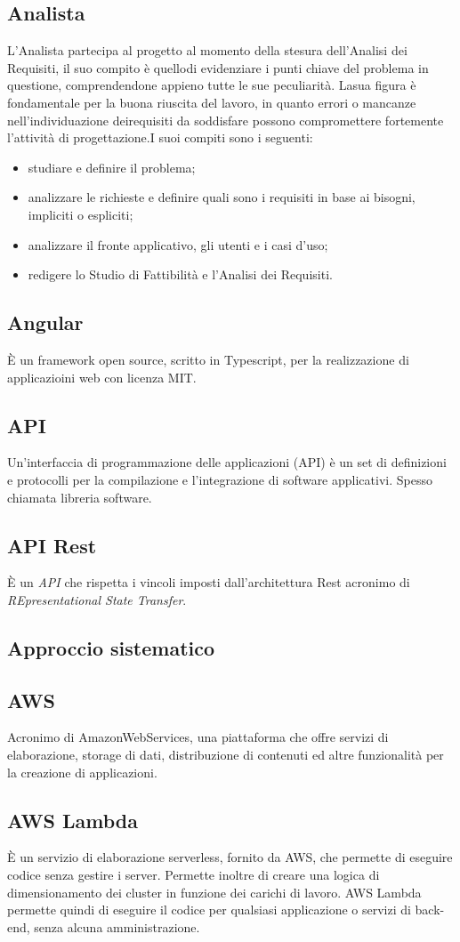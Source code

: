 \subsection*{Analista} L’Analista partecipa al progetto al momento della stesura dell’Analisi dei Requisiti, il suo compito è quellodi evidenziare i punti chiave del problema in questione, comprendendone appieno tutte le sue peculiarità. Lasua figura è fondamentale per la buona riuscita del lavoro, in quanto errori o mancanze nell’individuazione deirequisiti da soddisfare possono compromettere fortemente l’attività di progettazione.I suoi compiti sono i seguenti:
\begin{itemize}
    \item studiare e definire il problema;
    \item analizzare le richieste e definire quali sono i requisiti in base ai bisogni, impliciti o espliciti;
    \item analizzare il fronte applicativo, gli utenti e i casi d’uso;
    \item redigere lo Studio di Fattibilità e l’Analisi dei Requisiti.
\end{itemize}
\subsection*{Angular} È un framework open source, scritto in Typescript, per la realizzazione di applicazioini web con licenza MIT.
\subsection*{API} Un'interfaccia di programmazione delle applicazioni (API) è un set di definizioni e protocolli per la compilazione e l'integrazione di software applicativi. Spesso chiamata libreria software.
\subsection*{API Rest} È un \textit{API} che rispetta i vincoli imposti dall'architettura Rest acronimo di \textit{REpresentational State Transfer}.
\subsection*{Approccio sistematico}
\subsection*{AWS} Acronimo di AmazonWebServices, una piattaforma che offre servizi di elaborazione, storage di dati, distribuzione di contenuti ed altre funzionalità per la creazione di applicazioni.
\subsection*{AWS Lambda} È un servizio di elaborazione serverless, fornito da AWS, che permette di eseguire codice senza gestire i server. Permette inoltre di creare una logica di dimensionamento dei cluster in funzione dei carichi di lavoro. AWS Lambda permette quindi di eseguire il codice per qualsiasi applicazione o servizi di back-end, senza alcuna amministrazione.
